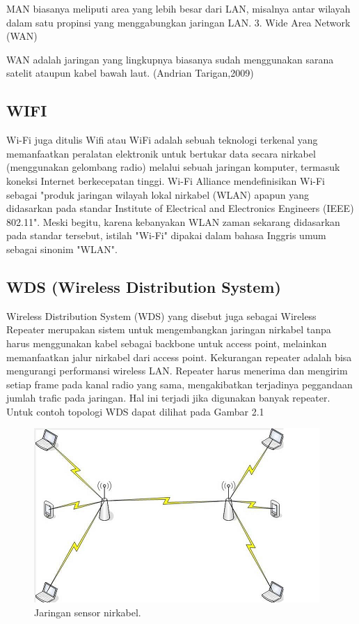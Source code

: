 \documentclass{jtetiproposalskripsi}
\begin{document}
MAN biasanya meliputi area yang lebih besar dari LAN, misalnya antar wilayah dalam satu propinsi yang menggabungkan jaringan LAN.
3.  Wide Area Network (WAN)

WAN  adalah  jaringan  yang  lingkupnya  biasanya  sudah  menggunakan sarana satelit ataupun kabel bawah laut.
(Andrian Tarigan,2009)



\subsection{WIFI}
Wi-Fi juga ditulis Wifi atau WiFi adalah sebuah teknologi terkenal yang memanfaatkan peralatan elektronik untuk bertukar data secara nirkabel (menggunakan gelombang radio) melalui sebuah jaringan komputer, termasuk koneksi  Internet  berkecepatan  tinggi.  Wi-Fi  Alliance  mendefinisikan  Wi-Fi sebagai "produk jaringan wilayah lokal nirkabel (WLAN) apapun yang didasarkan pada standar Institute of Electrical and Electronics Engineers (IEEE) 802.11". Meski  begitu,  karena  kebanyakan  WLAN  zaman  sekarang  didasarkan  pada standar tersebut, istilah  "Wi-Fi" dipakai dalam  bahasa  Inggris umum  sebagai sinonim "WLAN".

\subsection{WDS (Wireless Distribution System)}
Wireless Distribution System (WDS)  yang disebut juga sebagai Wireless Repeater merupakan sistem untuk mengembangkan jaringan nirkabel tanpa harus menggunakan kabel sebagai backbone untuk access point, melainkan memanfaatkan jalur nirkabel dari access point. Kekurangan repeater adalah bisa mengurangi performansi wireless LAN. Repeater harus menerima dan mengirim setiap frame pada kanal radio yang sama, mengakibatkan terjadinya peggandaan jumlah trafic pada jaringan. Hal ini terjadi jika digunakan banyak repeater. Untuk contoh topologi WDS dapat dilihat pada Gambar 2.1

\begin{figure}[ht!]
  \centering
    \includegraphics{gambar/1}
    \caption{Jaringan sensor nirkabel.}
    \label{1}
\end{figure}
\end{document}
